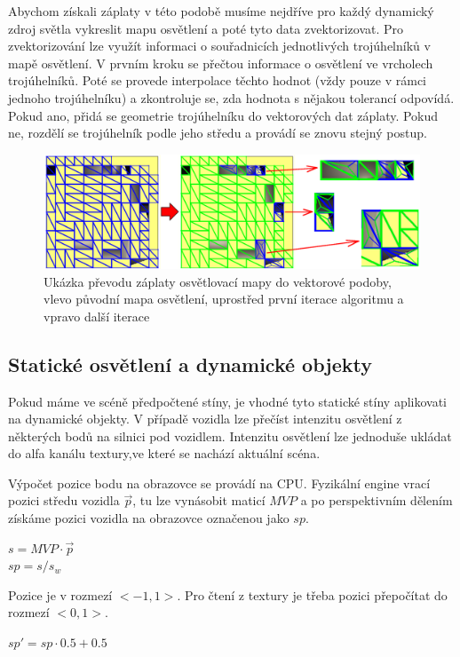 \documentclass[11pt,twoside,a4paper]{book}
\begin{document}
Abychom získali záplaty v této podobě musíme nejdříve pro každý dynamický zdroj světla vykreslit mapu osvětlení a poté tyto data zvektorizovat. Pro zvektorizování lze využít informaci o souřadnicích jednotlivých trojúhelníků v mapě osvětlení. V prvním kroku se přečtou informace o osvětlení ve vrcholech trojúhelníků. Poté se provede interpolace těchto hodnot (vždy pouze v rámci jednoho trojúhelníku) a zkontroluje se, zda hodnota s nějakou tolerancí odpovídá. Pokud ano, přidá se geometrie trojúhelníku do vektorových dat záplaty. Pokud ne, rozdělí se trojúhelník podle jeho středu a provádí se znovu stejný postup.
\newpage

\begin{center}
\begin{figure}[h]
\includegraphics[width=150mm]{figures/lmpatch.png}
\caption{Ukázka převodu záplaty osvětlovací mapy do vektorové podoby, vlevo původní mapa osvětlení, uprostřed první iterace algoritmu a vpravo další iterace}
\end{figure}
\end{center}

\subsection{Statické osvětlení a dynamické objekty}

Pokud máme ve scéně předpočtené stíny, je vhodné tyto statické stíny aplikovat\linebreak i na dynamické objekty. V případě vozidla lze přečíst intenzitu osvětlení z některých bodů na silnici pod vozidlem. Intenzitu osvětlení lze jednoduše ukládat do alfa kanálu textury,\linebreak ve které se nachází aktuální scéna.

Výpočet pozice bodu na obrazovce se provádí na CPU. Fyzikální engine vrací pozici středu vozidla $\vec{p}$, tu lze vynásobit maticí $MVP$ a po perspektivním dělením získáme pozici vozidla na obrazovce označenou jako $sp$. 
\begin{center}
$s = MVP \cdot \vec{p}$\\
$sp = s / s_w$
\end{center}
Pozice je v rozmezí $<-1, 1>$. Pro čtení z textury je třeba pozici přepočítat do rozmezí $<0, 1>$.
\begin{center}
$sp' = sp \cdot 0.5 + 0.5$
\end{center}
\end{document}
